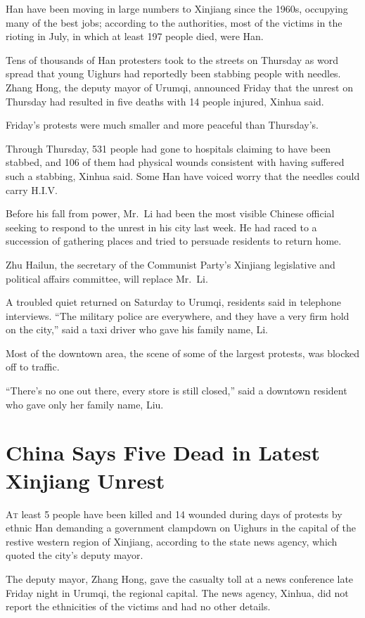 ﻿\documentclass[12pt]{article}
\begin{document}
Han have been moving in large numbers to Xinjiang since the 1960s, occupying many of the best jobs;
according to the authorities, most of the victims in the rioting in July, in which at least 197
people died, were Han.

Tens of thousands of Han protesters took to the streets on Thursday as word spread that young
Uighurs had reportedly been stabbing people with needles. Zhang Hong, the deputy mayor of Urumqi,
announced Friday that the unrest on Thursday had resulted in five deaths with 14 people injured,
Xinhua said.

Friday's protests were much smaller and more peaceful than Thursday's.

Through Thursday, 531 people had gone to hospitals claiming to have been stabbed, and 106 of them
had physical wounds consistent with having suffered such a stabbing, Xinhua said. Some Han have
voiced worry that the needles could carry H.I.V.

Before his fall from power, Mr.~Li had been the most visible Chinese official seeking to respond to
the unrest in his city last week. He had raced to a succession of gathering places and tried to
persuade residents to return home.

Zhu Hailun, the secretary of the Communist Party's Xinjiang legislative and political affairs
committee, will replace Mr.~Li.

A troubled quiet returned on Saturday to Urumqi, residents said in telephone interviews. ``The
military police are everywhere, and they have a very firm hold on the city,'' said a taxi driver who
gave his family name, Li.

Most of the downtown area, the scene of some of the largest protests, was blocked off to traffic.

``There's no one out there, every store is still closed,'' said a downtown resident who gave only
her family name, Liu.

\section{China Says Five Dead in Latest Xinjiang Unrest}

\lettrine{A}{t} least 5 people have been killed and 14 wounded during days of protests by ethnic Han
demanding a government clampdown on Uighurs in the capital of the restive western region of
Xinjiang, according to the state news agency, which quoted the city's deputy mayor.

The deputy mayor, Zhang Hong, gave the casualty toll at a news conference late Friday night in
Urumqi, the regional capital. The news agency, Xinhua, did not report the ethnicities of the victims
and had no other details.
\end{document}
